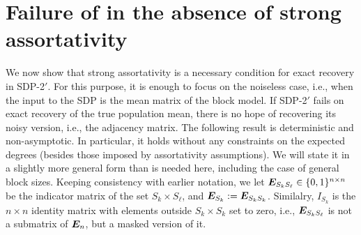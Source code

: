 \section{Failure of  in the absence of strong assortativity}
\label{sec:failure:SDP-2}
We now show that strong assortativity is a necessary condition for exact recovery in SDP-2$'$. For this purpose, it is enough to focus on the noiseless case, i.e., when the input to the SDP is the mean matrix of the block model. If SDP-2$'$ fails on exact recovery of the true population mean, there is no hope of recovering its noisy version, i.e., the adjacency matrix. The following result is deterministic and non-asymptotic. In particular, it holds without any constraints on the expected degrees (besides those imposed by assortativity assumptions).  We will state it in a slightly more general form than is needed here, including the case of general block sizes.   Keeping consistency with earlier notation, we let $\bm{E}_{S_k S_\ell} \in \{0,1\}^{n \times n}$ be the indicator matrix of the set $S_k \times S_\ell$, and $\bm{E}_{S_k} := \bm{E}_{S_k S_k}$. Similalry, $I_{S_k}$ is the ${n \times n}$ identity matrix with elements outside $S_k \times S_k$ set to zero, i.e., $\bm{E}_{S_k S_{\ell}}$ is not a submatrix of $\bm{E}_n$, but a masked version of it.



